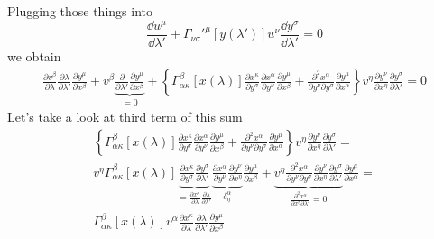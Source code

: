 %
Plugging those things into
%
\begin{equation}
    \frac{\dd u^\mu}{\dd\lambda'} +
    \Gamma_{\nu\sigma}'^{\mu}\left[y(\lambda')\right]u^\nu\frac{\dd y^\sigma}{\dd \lambda'}=0
\end{equation}
%
we obtain
%
\begin{gather}
    \frac{\partial v^\beta}{\partial\lambda}
    \frac{\partial \lambda}{\partial\lambda'}
    \frac{\partial y^\mu}{\partial x^\beta} +
    v^\beta
    \underbrace{\frac{\partial}{\partial \lambda'}
        \frac{\partial y^\mu}{\partial x^\beta}}_{=0} +
    \left\{\Gamma_{\alpha\kappa}^\beta\left[x(\lambda)\right]
    \frac{\partial x^\kappa}{\partial y^\sigma}
    \frac{\partial x^\alpha}{\partial y^\nu}
    \frac{\partial y^\mu}{\partial x^\beta}
    +
    \frac{\partial^2 x^\alpha}{\partial y^\nu \partial y^\sigma}
    \frac{\partial y^\mu}{\partial x^\alpha}\right\}
    v^\eta \frac{\partial y^\nu}{\partial x^\eta}
    \frac{\partial y^\sigma}{\partial \lambda'}=0
\end{gather}
%
Let's take a look at third term of this sum
%
\begin{multline}
    \left\{\Gamma_{\alpha\kappa}^\beta\left[x(\lambda)\right]
    \frac{\partial x^\kappa}{\partial y^\sigma}
    \frac{\partial x^\alpha}{\partial y^\nu}
    \frac{\partial y^\mu}{\partial x^\beta}
    +
    \frac{\partial^2 x^\alpha}{\partial y^\nu \partial y^\sigma}
    \frac{\partial y^\mu}{\partial x^\alpha}\right\}
    v^\eta \frac{\partial y^\nu}{\partial x^\eta}
    \frac{\partial y^\sigma}{\partial \lambda'}= \\
    v^\eta\Gamma_{\alpha\kappa}^\beta\left[x(\lambda)\right]
    \underbrace{\frac{\partial x^\kappa}{\partial y^\sigma}
        \frac{\partial y^\sigma}{\partial \lambda'}}_{=\frac{\partial x^\kappa}{\partial \lambda}\frac{\partial \lambda}{\partial \lambda'}}
    \underbrace{\frac{\partial x^\alpha}{\partial y^\nu}
        \frac{\partial y^\nu}{\partial x^\eta}}_{\delta_\eta^\alpha}
    \frac{\partial y^\mu}{\partial x^\beta}
    +
    \underbrace{v^\eta \frac{\partial^2 x^\alpha}{\partial y^\nu \partial y^\sigma}
        \frac{\partial y^\nu}{\partial x^\eta}
        \frac{\partial y^\sigma}{\partial \lambda'}}_{\frac{\partial^2 x^\alpha}{\partial x^\eta \partial \lambda'}=0}
    \frac{\partial y^\mu}{\partial x^\alpha}= \\
    \Gamma_{\alpha\kappa}^\beta\left[x(\lambda)\right]v^\alpha
    \frac{\partial x^\kappa}{\partial \lambda}\frac{\partial \lambda}{\partial \lambda'}
    \frac{\partial y^\mu}{\partial x^\beta}
\end{multline}
